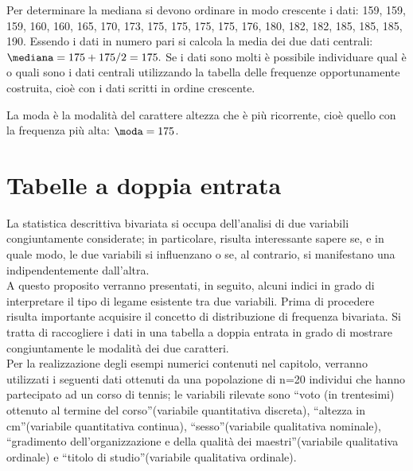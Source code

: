\begin{esempio}
Per determinare la mediana si devono ordinare in modo crescente i dati:
159, 159, 159, 160, 160, 165, 170, 173, 175, 175, 175, 175, 176, 180, 182, 
182, 185, 185, 185, 190.
Essendo i dati in numero pari si calcola la media dei due dati centrali:
$\mediana = {175+175}/{2}=175.$
Se i dati sono molti è possibile individuare qual è o quali sono i dati 
centrali utilizzando la tabella delle
frequenze opportunamente costruita, cioè con i dati scritti in ordine 
crescente.

La moda è la modalità del carattere altezza che è più ricorrente, cioè 
quello con la frequenza più alta:
$\moda = 175$.
\end{esempio}



\section{Tabelle a doppia entrata}
\label{sec:c_stat_doppia_entrata}

La statistica descrittiva bivariata si occupa dell'analisi di due variabili 
congiuntamente considerate; in particolare, risulta interessante sapere se, 
e in quale modo, le due variabili si influenzano o se, al contrario, si 
manifestano una indipendentemente dall'altra.\\ 
A questo proposito verranno presentati, in seguito, alcuni indici in grado 
di interpretare il tipo di legame esistente tra due variabili. Prima di 
procedere risulta importante acquisire il concetto di distribuzione di 
frequenza bivariata. 
Si tratta di raccogliere i dati in una tabella a doppia entrata in grado di 
mostrare congiuntamente le modalità dei due caratteri.\\
Per la realizzazione degli esempi numerici contenuti nel capitolo, verranno 
utilizzati i seguenti dati ottenuti da una popolazione di n=20 individui 
che hanno partecipato ad un corso di tennis; le variabili rilevate sono 
\textquotedblleft voto (in trentesimi) ottenuto al termine del 
corso\textquotedblright (variabile quantitativa discreta), 
\textquotedblleft altezza in cm\textquotedblright (variabile quantitativa 
continua), \textquotedblleft sesso\textquotedblright (variabile qualitativa 
nominale), \textquotedblleft gradimento dell'organizzazione e della qualità 
dei maestri\textquotedblright (variabile qualitativa ordinale) e 
\textquotedblleft titolo di studio\textquotedblright (variabile qualitativa 
ordinale).


